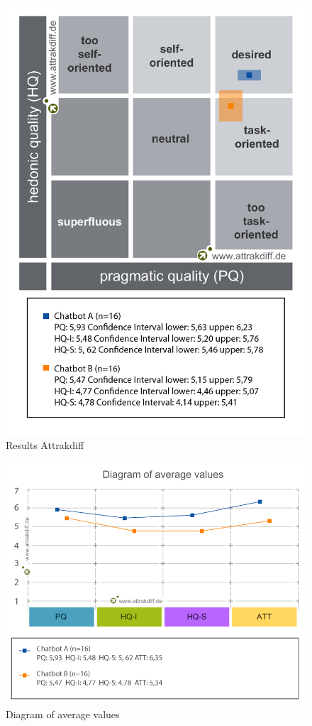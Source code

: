 \begin{figure}[h]
    \centering
    \includegraphics[scale=0.33]{figures/Portfolio-of-results-attrakdiff.png}
    \caption{Results Attrakdiff}
    \label{fig:portres}
\end{figure}

\begin{figure}[h]
    \centering
    \includegraphics[scale=0.4]{figures/Diagram-of-average-values.png}
    \caption{Diagram of average values}
    \label{fig:diagval}
\end{figure}

